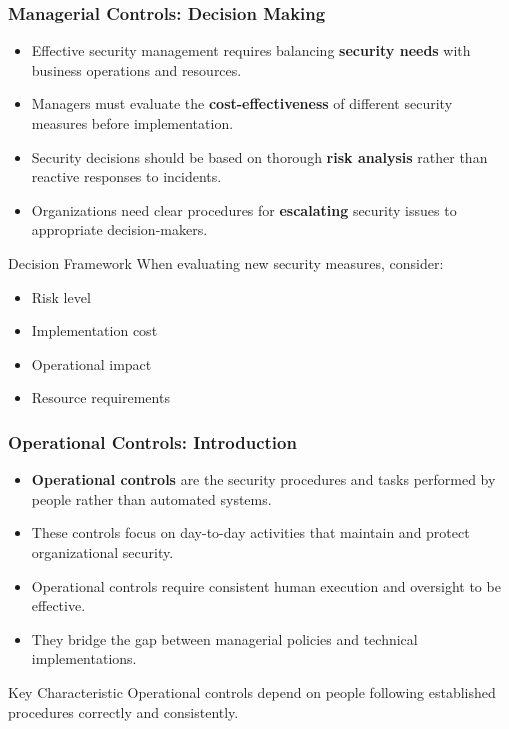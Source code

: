 \documentclass{beamer}
\begin{document}
\begin{frame}
    \frametitle{Managerial Controls: Decision Making}
    
    \begin{itemize}
        \item Effective security management requires balancing \textbf{security needs} with business operations and resources.
        
        \item Managers must evaluate the \textbf{cost-effectiveness} of different security measures before implementation.
        
        \item Security decisions should be based on thorough \textbf{risk analysis} rather than reactive responses to incidents.
        
        \item Organizations need clear procedures for \textbf{escalating} security issues to appropriate decision-makers.
    \end{itemize}
    
    \begin{exampleblock}{Decision Framework}
        When evaluating new security measures, consider:
        \begin{itemize}
            \item Risk level
            \item Implementation cost
            \item Operational impact
            \item Resource requirements
        \end{itemize}
    \end{exampleblock}
\end{frame}

\begin{frame}
    \frametitle{Operational Controls: Introduction}
    
    \begin{itemize}
        \item \textbf{Operational controls} are the security procedures and tasks performed by people rather than automated systems.
        
        \item These controls focus on day-to-day activities that maintain and protect organizational security.
        
        \item Operational controls require consistent human execution and oversight to be effective.
        
        \item They bridge the gap between managerial policies and technical implementations.
    \end{itemize}
    
    \begin{block}{Key Characteristic}
        Operational controls depend on people following established procedures correctly and consistently.
    \end{block}
\end{frame}
\end{document}
